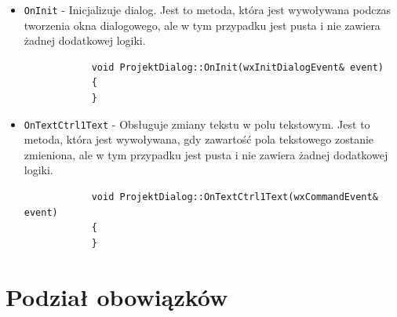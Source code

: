 \documentclass[]{article}
\begin{document}
	\begin{itemize}
		\item \texttt{OnInit} - Inicjalizuje dialog. Jest to metoda, która jest wywoływana podczas tworzenia okna dialogowego, ale w tym przypadku jest pusta i nie zawiera żadnej dodatkowej logiki.
		\begin{verbatim}
			void ProjektDialog::OnInit(wxInitDialogEvent& event)
			{
			}
		\end{verbatim}
		\item \texttt{OnTextCtrl1Text} - Obsługuje zmiany tekstu w polu tekstowym. Jest to metoda, która jest wywoływana, gdy zawartość pola tekstowego zostanie zmieniona, ale w tym przypadku jest pusta i nie zawiera żadnej dodatkowej logiki.
		\begin{verbatim}
			void ProjektDialog::OnTextCtrl1Text(wxCommandEvent& event)
			{
			}
		\end{verbatim}
	\end{itemize}
\newpage
\section{Podział obowiązków}
\end{document}
